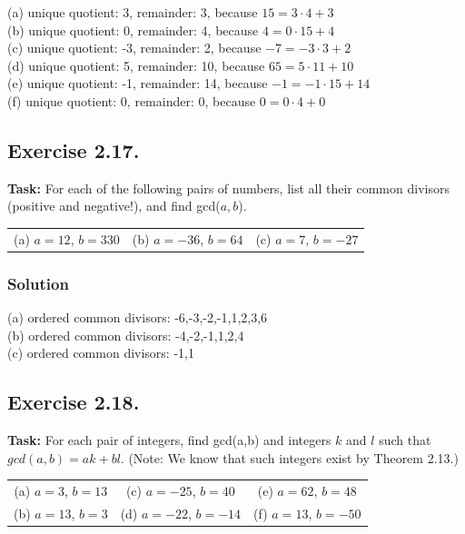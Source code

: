 \documentclass{article}
\begin{document}
(a) unique quotient: 3, remainder: 3, because $15=3 \cdot 4+3$\\
(b) unique quotient: 0, remainder: 4, because $4=0 \cdot 15 +4$\\
(c) unique quotient: -3, remainder: 2, because $-7=-3 \cdot 3+2$\\
(d) unique quotient: 5, remainder: 10, because $65=5 \cdot 11+10$\\
(e) unique quotient: -1, remainder: 14, because $-1=-1 \cdot 15+14$\\
(f) unique quotient: 0, remainder: 0, because $0=0 \cdot 4+0$\\

\subsection{Exercise 2.17.}
\textbf{Task:} For each of the following pairs of numbers, list all their common divisors (positive and negative!), and find gcd($a,b$).

\begin{center}
    \begin{tabular}{ccc}
        (a) $a = 12$, $b = 330$ & (b) $a = -36$, $b = 64$ & (c) $a = 7$, $b = -27$ \\
    \end{tabular}
\end{center}

\subsubsection*{Solution}

(a) ordered common divisors: -6,-3,-2,-1,1,2,3,6\\
(b) ordered common divisors: -4,-2,-1,1,2,4\\
(c) ordered common divisors: -1,1

\subsection{Exercise 2.18.}
\textbf{Task:} For each pair of integers, find gcd(a,b) and integers $k$ and $l$ such that $gcd(a,b) =ak+bl$. (Note: We know that such integers exist by Theorem 2.13.)

\begin{center}
    \begin{tabular}{ccc}
        (a) $a = 3$, $b = 13$ & (c) $a = -25$, $b = 40$ & (e) $a = 62$, $b = 48$ \\
        (b) $a = 13$, $b = 3$ & (d) $a = -22$, $b =-14$ & (f) $a = 13$, $b = -50$ \\
    \end{tabular}
\end{center}
\end{document}
